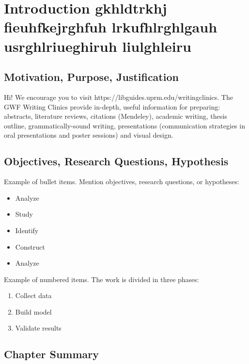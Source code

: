 

\chapter{Introduction gkhldtrkhj fieuhfkejrghfuh lrkufhlrghlgauh usrghlriueghiruh liulghleiru}  
\section{Motivation, Purpose, Justification}

\noindent Hi! We encourage you to visit https://libguides.uprm.edu/writingclinics. The GWF Writing Clinics provide in-depth, useful information for preparing: abstracts, literature reviews, citations (Mendeley), academic writing, thesis outline, grammatically-sound writing, presentations (communication strategies in oral presentations and poster sessions) and visual design.  %

\section{Objectives, Research Questions, Hypothesis}


\noindent Example of bullet items. Mention objectives, research questions, or hypotheses:
\begin{itemize}
\item Analyze
\item Study 
\item Identify
\item Construct
\item Analyze 
\end{itemize}
	
\noindent Example of numbered items. The work is divided in three phases: 

\begin{enumerate}
\item Collect data
\item Build model
\item Validate results
\end{enumerate} 


\section{Chapter Summary}


